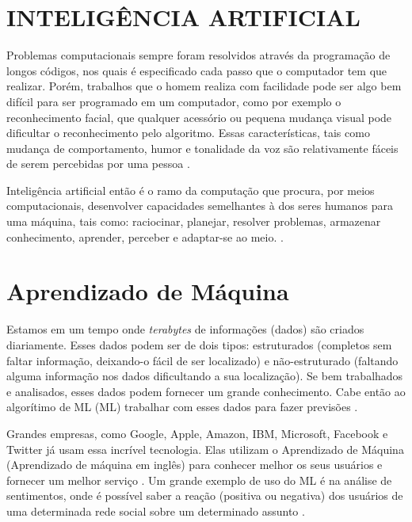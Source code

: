\section{INTELIGÊNCIA ARTIFICIAL }
\label{sec:INTELIGÊNCIA ARTIFICIAL }

Problemas computacionais sempre foram resolvidos através da programação de
longos códigos, nos quais é especificado cada passo que o computador tem que realizar. Porém, trabalhos que o homem realiza com facilidade pode ser algo bem difícil para ser programado em um computador, como por exemplo o reconhecimento facial, que qualquer acessório ou pequena mudança visual pode dificultar o reconhecimento pelo algoritmo. Essas características, tais como mudança de comportamento, humor e tonalidade da voz são relativamente fáceis de serem percebidas por uma pessoa \cite{lorenafaceli2011inteligencia}. 

 
Inteligência artificial então é o ramo da computação que procura, por meios computacionais, desenvolver capacidades semelhantes à dos seres humanos para uma máquina, tais como: raciocinar, planejar, resolver problemas, armazenar conhecimento, aprender, perceber e adaptar-se ao meio. \cite{Fernando}.

\section{Aprendizado de Máquina}
\label{sec:aprendizado de máquina}

Estamos em um tempo onde \textit{terabytes} de informações (dados) são criados diariamente. Esses dados podem ser de dois tipos: estruturados (completos sem faltar informação, deixando-o fácil de ser localizado) e não-estruturado (faltando alguma informação nos dados dificultando a sua localização). Se bem trabalhados e analisados, esses dados podem fornecer um grande conhecimento. Cabe então ao algorítimo de \acrlong{ML} (ML) trabalhar com esses dados para fazer previsões \cite{pythonmachinelearning}. 

Grandes empresas, como Google, Apple, Amazon, IBM, Microsoft, Facebook e Twitter já usam essa incrível tecnologia. Elas utilizam o Aprendizado de Máquina (Aprendizado de máquina em inglês) para conhecer melhor os seus usuários e fornecer um melhor serviço \cite{pythonmachinelearning}. Um grande exemplo de uso do ML é na análise de sentimentos, onde é possível saber a reação (positiva ou negativa) dos usuários de uma determinada rede social sobre um determinado assunto \cite{sentimentos}.

